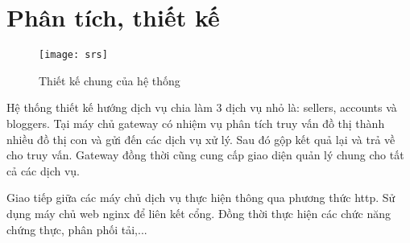 \fontsize{13px}{13px}\selectfont\justifying

\section{Phân tích, thiết kế}\label{section:readme}
	\begin{figure}[h!]\fontsize{13px}{13px}\selectfont
		\begin{center}	
			\texttt{[image: srs]}
			\caption{Thiết kế chung của hệ thống}
		\end{center}
	\end{figure}
	Hệ thống thiết kế hướng dịch vụ chia làm 3 dịch vụ nhỏ là: sellers, accounts và bloggers. Tại máy chủ gateway có nhiệm vụ phân tích truy vấn đồ thị thành nhiều đồ thị con và gửi đến các dịch vụ xử lý. Sau đó gộp kết quả lại và trả về cho truy vấn. Gateway đồng thời cũng cung cấp giao diện quản lý chung cho tất cả các dịch vụ.
	
	Giao tiếp giữa các máy chủ dịch vụ thực hiện thông qua phương thức \acrshort{http}. Sử dụng máy chủ web nginx để liên kết cổng. Đồng thời thực hiện các chức năng chứng thực, phân phối tải,...
